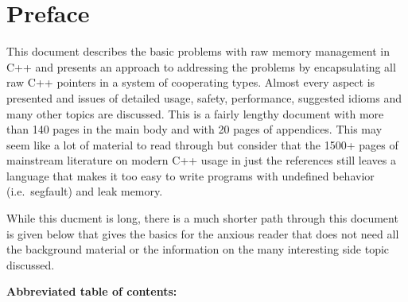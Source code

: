 \documentclass[pdf,ps2pdf,11pt]{SANDreport}
\begin{document}
%
\cleardoublepage   %
\tableofcontents
\listoffigures
\listoftables


\clearpage
\section*{Preface}

This document describes the basic problems with raw memory management
in C++ and presents an approach to addressing the problems by
encapsulating all raw C++ pointers in a system of cooperating types.
Almost every aspect is presented and issues of detailed usage, safety,
performance, suggested idioms and many other topics are discussed.
This is a fairly lengthy document with more than 140 pages in the main
body and with 20 pages of appendices.  This may seem like a lot of
material to read through but consider that the 1500+ pages of
mainstream literature on modern C++ usage in just the references
{}\cite{stroustrup97, C++CodingStandards05, C++Gotchas03,
EffectiveC++ThirdEdition} still leaves a language that makes it too
easy to write programs with undefined behavior (i.e.\ segfault) and
leak memory.

While this ducment is long, there is a much shorter path through this
document is given below that gives the basics for the anxious reader
that does not need all the background material or the information on
the many interesting side topic discussed.

{}\noindent\textbf{Abbreviated table of contents:}
\end{document}
